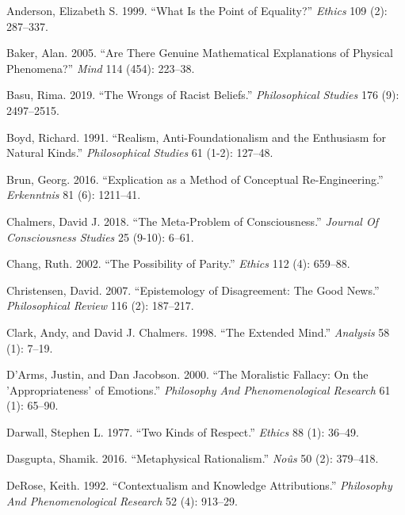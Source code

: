 \documentclass[
  10pt,
  letterpaper,
  DIV=11,
  numbers=noendperiod,
  twoside]{scrartcl}
\newlength{\cslhangindent}
\newenvironment{CSLReferences}[2] %
 {\begin{list}{}{%
  \setlength{\itemindent}{0pt}
  \setlength{\leftmargin}{0pt}
  \setlength{\parsep}{0pt}
  \ifodd #1
   \setlength{\leftmargin}{\cslhangindent}
   \setlength{\itemindent}{-1\cslhangindent}
  \fi
  \setlength{\itemsep}{#2\baselineskip}}}
 {\end{list}}
\begin{document}
\label{refs}
\begin{CSLReferences}{1}{0}
Anderson, Elizabeth S. 1999. {``What Is the Point of Equality?''}
\emph{Ethics} 109 (2): 287--337.

Baker, Alan. 2005. {``Are There Genuine Mathematical Explanations of
Physical Phenomena?''} \emph{Mind} 114 (454): 223--38.

Basu, Rima. 2019. {``The Wrongs of Racist Beliefs.''}
\emph{Philosophical Studies} 176 (9): 2497--2515.

Boyd, Richard. 1991. {``Realism, Anti-Foundationalism and the Enthusiasm
for Natural Kinds.''} \emph{Philosophical Studies} 61 (1-2): 127--48.

Brun, Georg. 2016. {``Explication as a Method of Conceptual
Re-Engineering.''} \emph{Erkenntnis} 81 (6): 1211--41.

Chalmers, David J. 2018. {``The Meta-Problem of Consciousness.''}
\emph{Journal Of Consciousness Studies} 25 (9-10): 6--61.

Chang, Ruth. 2002. {``The Possibility of Parity.''} \emph{Ethics} 112
(4): 659--88.

Christensen, David. 2007. {``Epistemology of Disagreement: The Good
News.''} \emph{Philosophical Review} 116 (2): 187--217.

Clark, Andy, and David J. Chalmers. 1998. {``The Extended Mind.''}
\emph{Analysis} 58 (1): 7--19.

D'Arms, Justin, and Dan Jacobson. 2000. {``The Moralistic Fallacy: On
the 'Appropriateness' of Emotions.''} \emph{Philosophy And
Phenomenological Research} 61 (1): 65--90.

Darwall, Stephen L. 1977. {``Two Kinds of Respect.''} \emph{Ethics} 88
(1): 36--49.

Dasgupta, Shamik. 2016. {``Metaphysical Rationalism.''} \emph{Noûs} 50
(2): 379--418.

DeRose, Keith. 1992. {``Contextualism and Knowledge Attributions.''}
\emph{Philosophy And Phenomenological Research} 52 (4): 913--29.


\end{CSLReferences}
\end{document}
